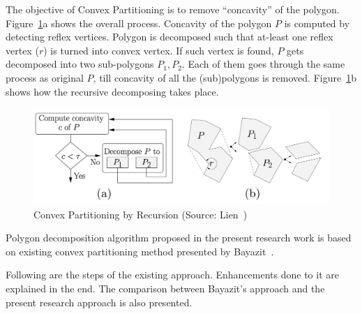 The objective of Convex Partitioning is to remove ``concavity'' of the polygon. Figure~\ref{fig_LienCEP}a shows the overall process. Concavity of the polygon $P$ is computed by detecting reflex vertices. Polygon is decomposed such that at-least one reflex vertex ($r$) is turned into convex vertex. If such vertex is found, $P$ gets decomposed into two sub-polygons $P_1, P_2$. Each of them goes through the same process as original $P$, till concavity of all the (sub)polygons is removed. Figure~\ref{fig_LienCEP}b shows how the recursive decomposing takes place.



\begin{figure}[h]
\centering \includegraphics[width=0.92\linewidth]{images/LienCEP} 
\caption{Convex Partitioning by Recursion (Source: Lien~\cite{Lien2004})}
\label{fig_LienCEP}
\end{figure}


Polygon decomposition algorithm proposed in the present research work is based on existing convex partitioning method presented by Bayazit~\cite{Bayazit}. 

Following are the steps of the existing approach. Enhancements done to it are explained in the end.  The comparison between Bayazit's approach and the present research approach is also presented.


